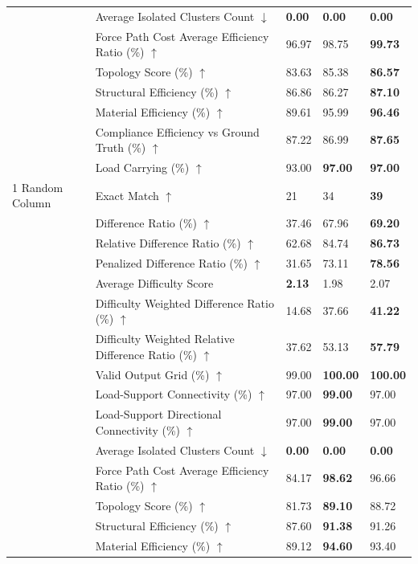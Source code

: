 \begin{table}[!h]
{\begin{tabular}{lllll}
 & Average Isolated Clusters Count $\downarrow$ & \textbf{0.00} & \textbf{0.00} & \textbf{0.00} \\
 & Force Path Cost Average Efficiency Ratio (\%) $\uparrow$ & 96.97 & 98.75 & \textbf{99.73} \\
 & Topology Score (\%) $\uparrow$ & 83.63 & 85.38 & \textbf{86.57} \\
 & Structural Efficiency (\%) $\uparrow$ & 86.86 & 86.27 & \textbf{87.10} \\
 & Material Efficiency (\%) $\uparrow$ & 89.61 & 95.99 & \textbf{96.46} \\
 & Compliance Efficiency vs Ground Truth (\%) $\uparrow$ & 87.22 & 86.99 & \textbf{87.65} \\
 & Load Carrying (\%) $\uparrow$ & 93.00 & \textbf{97.00} & \textbf{97.00} \\
1 Random Column & Exact Match $\uparrow$ & 21 & 34 & \textbf{39} \\
 & Difference Ratio (\%) $\uparrow$ & 37.46 & 67.96 & \textbf{69.20} \\
 & Relative Difference Ratio (\%) $\uparrow$ & 62.68 & 84.74 & \textbf{86.73} \\
 & Penalized Difference Ratio (\%) $\uparrow$ & 31.65 & 73.11 & \textbf{78.56} \\
 & Average Difficulty Score & \textbf{2.13} & 1.98 & 2.07 \\
 & Difficulty Weighted Difference Ratio (\%) $\uparrow$ & 14.68 & 37.66 & \textbf{41.22} \\
 & Difficulty Weighted Relative Difference Ratio (\%) $\uparrow$ & 37.62 & 53.13 & \textbf{57.79} \\
 & Valid Output Grid (\%) $\uparrow$ & 99.00 & \textbf{100.00} & \textbf{100.00} \\
 & Load-Support Connectivity (\%) $\uparrow$ & 97.00 & \textbf{99.00} & 97.00 \\
 & Load-Support Directional Connectivity (\%) $\uparrow$ & 97.00 & \textbf{99.00} & 97.00 \\
 & Average Isolated Clusters Count $\downarrow$ & \textbf{0.00} & \textbf{0.00} & \textbf{0.00} \\
 & Force Path Cost Average Efficiency Ratio (\%) $\uparrow$ & 84.17 & \textbf{98.62} & 96.66 \\
 & Topology Score (\%) $\uparrow$ & 81.73 & \textbf{89.10} & 88.72 \\
 & Structural Efficiency (\%) $\uparrow$ & 87.60 & \textbf{91.38} & 91.26 \\
 & Material Efficiency (\%) $\uparrow$ & 89.12 & \textbf{94.60} & 93.40 \\

\end{tabular}}
\end{table}
